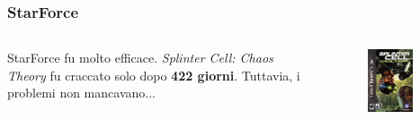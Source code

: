 \documentclass{beamer}
\begin{document}
	\begin{frame}
		\frametitle{StarForce}
		\begin{columns}
			\begin{column}{0.6\textwidth}
				StarForce fu molto efficace. \newline \newline
				\textit{Splinter Cell: Chaos Theory} fu craccato solo dopo \textbf{422 giorni}.
				\newline \newline
				Tuttavia, i problemi non mancavano...
			\end{column}
			\begin{column}{0.4\textwidth}
				\begin{figure}[h]
					\centering
					\includegraphics[width=0.8\textwidth]{imgs/SCCT_Coverart.png}
				\end{figure}
			\end{column}
		\end{columns}	
	\end{frame}
\end{document}
